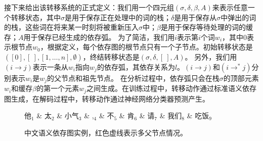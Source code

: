 接下来给出该转移系统的正式定义：我们用一个四元组$(\sigma,\delta,\beta,A)$来表示任意一个转移状态，其中$\sigma$是用于保存正在处理中的词的栈；$\delta$是用于保存从$\sigma$中弹出的词的栈，这些词在将来某一时刻将被重新压入$\sigma$中；$\beta$是用于保存等待处理的词的缓存；$A$用于保存已经生成的依存弧。
为了简洁，我们用$i$表示第$i$个词$w_i$，其中$0$表示根节点$w_0$，根据定义，每个依存图的根节点只有一个子节点。初始转移状态是$([0],[\ ],[1,\dots,n],\emptyset)$，终结转移状态是$(\sigma,\delta,[\ ],A)$。
另外，我们用$(i\rightarrow j)$表示一条从$w_i$指向$w_j$的依存弧，其依存关系为$l$。$(i\rightarrow j)$和$(i\rightarrow^*j)$分别表示$w_i$是$w_j$的父节点和祖先节点。
在分析过程中，依存弧只会在栈$\sigma$的顶部元素$w_i$和缓存$\beta$的第一个元素$w_j$之间生成。在训练过程中，转移动作通过标准语义依存图生成，在解码过程中，转移动作通过神经网络分类器预测产生。

\begin{figure}[tb]
	\centering
	\begin{dependency}[theme = simple,label style={font=\bfseries,thick}]
		\begin{deptext}[column sep=0.5em]
			他$_1$ \& 太$_2$ \& 小气$_3$ \& ,$_4$ \& 不$_5$ \& 肯$_6$ \& 请$_7$ \& 我们$_8$ \& 吃饭$_9$ \\
		\end{deptext}
	\end{dependency}
	\caption{中文语义依存图实例，红色虚线表示多父节点情况。}
	\label{fig:csdg0}
\end{figure}

